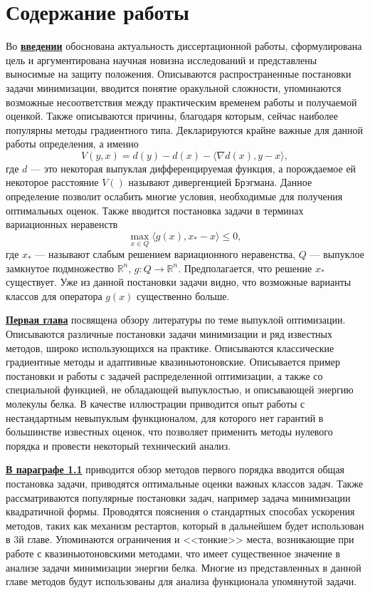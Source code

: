 \section*{Содержание работы}
Во \underline{\textbf{введении}} обоснована актуальность диссертационной работы, сформулирована цель и аргументирована научная новизна исследований и представлены выносимые на защиту положения. Описываются распространенные постановки задачи минимизации, вводится понятие оракульной сложности, упоминаются возможные несоответствия между практическим временем работы и получаемой оценкой. Также описываются причины, благодаря которым, сейчас наиболее популярны методы градиентного типа. Декларируются крайне важные для данной работы определения, а именно 
\[
    V(y, x) = d(y) - d(x) - \langle \nabla d(x), y - x \rangle,
\]
где $d$ --- это некоторая выпуклая дифференцируемая функция, а порождаемое ей некоторое расстояние $V()$ называют дивергенцией Брэгмана. \cite{Bauschke} Данное определение позволит ослабить многие условия, необходимые для получения оптимальных оценок. Также вводится постановка задачи в терминах вариационных неравенств
$$
    \max_{x \in Q} \langle g(x), x_* - x \rangle \leq 0,
$$
где $x_*$ --- называют слабым решением вариационного неравенства, $Q$ --- выпуклое замкнутое подмножество $\mathbb{R}^n$, $g: Q \longrightarrow \mathbb{R}^n$. Предполагается, что решение $x_*$ существует. Уже из данной постановки задачи видно, что возможные варианты классов для оператора $g(x)$ существенно больше.


\underline{\textbf{Первая глава}} посвящена обзору литературы по теме выпуклой оптимизации. Описываются различные постановки задачи минимизации и ряд известных методов, широко использующихся на практике. Описываются классические градиентные методы и адаптивные квазиньютоновские. Описывается пример постановки и работы с задачей распределенной оптимизации, а также со специальной функцией, не обладающей выпуклостью, и описывающей энергию молекулы белка. В качестве иллюстрации приводится опыт работы с нестандартным невыпуклым функционалом, для которого нет гарантий в большинстве известных оценок, что позволяет применить методы нулевого порядка и провести некоторый технический анализ.

\underline{\textbf{В параграфе 1.1}} приводится обзор методов первого порядка вводится общая постановка задачи, приводятся оптимальные оценки важных классов задач. Также рассматриваются популярные постановки задач, например задача минимизации квадратичной формы. Проводятся пояснения о стандартных способах ускорения методов, таких как механизм рестартов, который в дальнейшем будет использован в 3й главе. Упоминаются ограничения и <<тонкие>> места, возникающие при работе с квазиньютоновскими методами, что имеет существенное значение в анализе задачи минимизации энергии белка. Многие из представленных в данной главе методов будут использованы для анализа функционала упомянутой задачи.

